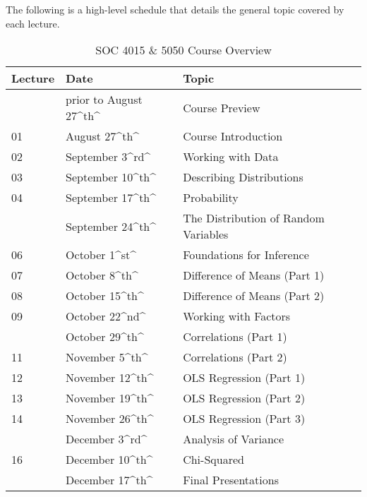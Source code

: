 \documentclass[]{book}
\theoremstyle{definition}
\theoremstyle{definition}
\theoremstyle{definition}
\theoremstyle{remark}
\begin{document}
The following is a high-level schedule that details the general topic
covered by each lecture.

\begin{table}

\caption{\label{tab:unnamed-chunk-1}SOC 4015 & 5050 Course Overview}
\centering
\begin{tabular}[t]{lll}
\toprule
Lecture & Date & Topic\\
\midrule
 & prior to August 27\textasciicircum{}th\textasciicircum{} & Course Preview\\
01 & August 27\textasciicircum{}th\textasciicircum{} & Course Introduction\\
02 & September 3\textasciicircum{}rd\textasciicircum{} & Working with Data\\
03 & September 10\textasciicircum{}th\textasciicircum{} & Describing Distributions\\
04 & September 17\textasciicircum{}th\textasciicircum{} & Probability\\
\addlinespace
05 & September 24\textasciicircum{}th\textasciicircum{} & The Distribution of Random Variables\\
06 & October 1\textasciicircum{}st\textasciicircum{} & Foundations for Inference\\
07 & October 8\textasciicircum{}th\textasciicircum{} & Difference of Means (Part 1)\\
08 & October 15\textasciicircum{}th\textasciicircum{} & Difference of Means (Part 2)\\
09 & October 22\textasciicircum{}nd\textasciicircum{} & Working with Factors\\
\addlinespace
10 & October 29\textasciicircum{}th\textasciicircum{} & Correlations (Part 1)\\
11 & November 5\textasciicircum{}th\textasciicircum{} & Correlations (Part 2)\\
12 & November 12\textasciicircum{}th\textasciicircum{} & OLS Regression (Part 1)\\
13 & November 19\textasciicircum{}th\textasciicircum{} & OLS Regression (Part 2)\\
14 & November 26\textasciicircum{}th\textasciicircum{} & OLS Regression (Part 3)\\
\addlinespace
15 & December 3\textasciicircum{}rd\textasciicircum{} & Analysis of Variance\\
16 & December 10\textasciicircum{}th\textasciicircum{} & Chi-Squared\\
 & December 17\textasciicircum{}th\textasciicircum{} & Final Presentations\\
\bottomrule
\end{tabular}
\end{table}
\end{document}
